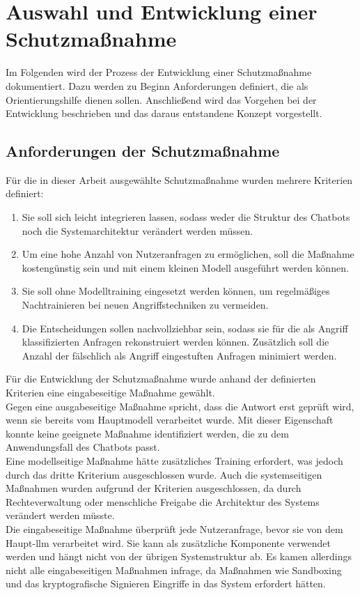 \section{Auswahl und Entwicklung einer Schutzmaßnahme}\label{konzept}

Im Folgenden wird der Prozess der Entwicklung einer Schutzmaßnahme dokumentiert. Dazu werden zu Beginn Anforderungen definiert, die als Orientierungshilfe 
dienen sollen. Anschließend wird das Vorgehen bei der Entwicklung beschrieben und das daraus entstandene Konzept vorgestellt.

\subsection{Anforderungen der Schutzmaßnahme}

Für die in dieser Arbeit ausgewählte Schutzmaßnahme wurden mehrere Kriterien definiert:

\begin{enumerate}
    \item Sie soll sich leicht integrieren lassen, sodass weder die Struktur des Chatbots noch die Systemarchitektur verändert werden müssen. 
    \item Um eine hohe Anzahl von Nutzeranfragen zu ermöglichen, soll die Maßnahme kostengünstig sein und mit einem kleinen Modell ausgeführt werden können.
    \item Sie soll ohne Modelltraining eingesetzt werden können, um regelmäßiges Nachtrainieren bei neuen Angriffstechniken zu vermeiden.
    \item Die Entscheidungen sollen nachvollziehbar sein, sodass sie für die als Angriff klassifizierten Anfragen rekonstruiert werden können. Zusätzlich
    soll die Anzahl der fälschlich als Angriff eingestuften Anfragen minimiert werden.
\end{enumerate}

Für die Entwicklung der Schutzmaßnahme wurde anhand der definierten Kriterien eine eingabeseitige Maßnahme gewählt. \\
Gegen eine ausgabeseitige Maßnahme spricht, dass die Antwort erst geprüft wird, wenn sie bereits vom Hauptmodell verarbeitet wurde. Mit dieser Eigenschaft
konnte keine geeignete Maßnahme identifiziert werden, die zu dem Anwendungsfall des Chatbots passt. \\
Eine modellseitige Maßnahme hätte zusätzliches Training erfordert, was jedoch durch das dritte Kriterium ausgeschlossen wurde. 
Auch die systemseitigen Maßnahmen wurden aufgrund der Kriterien ausgeschlossen, da durch Rechteverwaltung oder menschliche Freigabe die Architektur des Systems
verändert werden müsste. \\
Die eingabeseitige Maßnahme überprüft jede Nutzeranfrage, bevor sie von dem Haupt-\ac{llm} verarbeitet wird. Sie kann als zusätzliche Komponente verwendet werden und 
hängt nicht von der übrigen Systemstruktur ab. Es kamen allerdings nicht alle eingabeseitigen Maßnahmen infrage, da Maßnahmen wie Sandboxing und das kryptografische 
Signieren Eingriffe in das System erfordert hätten.


